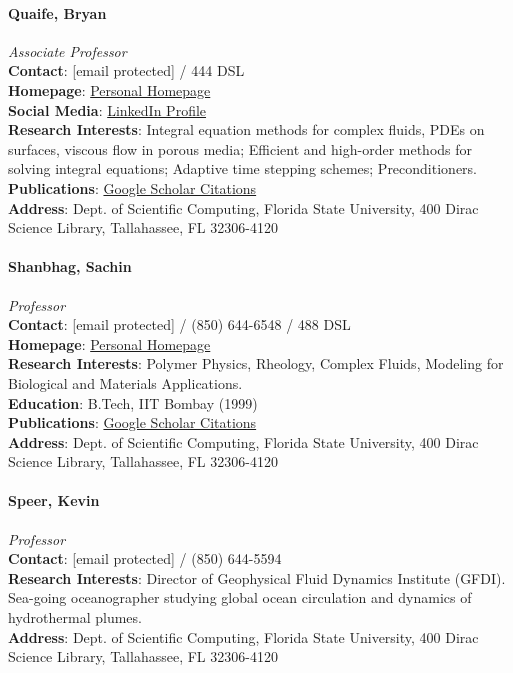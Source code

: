 \documentclass[12pt,a4paper]{article}
\begin{document}
\paragraph{Quaife, Bryan}
\textit{Associate Professor}\\
\textbf{Contact}: [email protected] / 444 DSL\\
\textbf{Homepage}: \href{http://people.sc.fsu.edu/~bquaife/}{Personal Homepage}\\
\textbf{Social Media}: \href{https://www.linkedin.com/in/bryan-quaife-591b9356/}{LinkedIn Profile}\\
\textbf{Research Interests}: Integral equation methods for complex fluids, PDEs on surfaces, viscous flow in porous media; Efficient and high-order methods for solving integral equations; Adaptive time stepping schemes; Preconditioners.\\
\textbf{Publications}: \href{https://scholar.google.com/citations?user=Y9o12rsAAAAJ}{Google Scholar Citations}\\
\textbf{Address}: Dept. of Scientific Computing, Florida State University, 400 Dirac Science Library, Tallahassee, FL 32306-4120

\paragraph{Shanbhag, Sachin}
\textit{Professor}\\
\textbf{Contact}: [email protected] / (850) 644-6548 / 488 DSL\\
\textbf{Homepage}: \href{https://sachin.sc.fsu.edu/}{Personal Homepage}\\
\textbf{Research Interests}: Polymer Physics, Rheology, Complex Fluids, Modeling for Biological and Materials Applications.\\
\textbf{Education}: B.Tech, IIT Bombay (1999)\\
\textbf{Publications}: \href{https://scholar.google.com/citations?user=1pWDPk0AAAAJ}{Google Scholar Citations}\\
\textbf{Address}: Dept. of Scientific Computing, Florida State University, 400 Dirac Science Library, Tallahassee, FL 32306-4120

\paragraph{Speer, Kevin}
\textit{Professor}\\
\textbf{Contact}: [email protected] / (850) 644-5594\\
\textbf{Research Interests}: Director of Geophysical Fluid Dynamics Institute (GFDI). Sea-going oceanographer studying global ocean circulation and dynamics of hydrothermal plumes.\\
\textbf{Address}: Dept. of Scientific Computing, Florida State University, 400 Dirac Science Library, Tallahassee, FL 32306-4120
\end{document}
